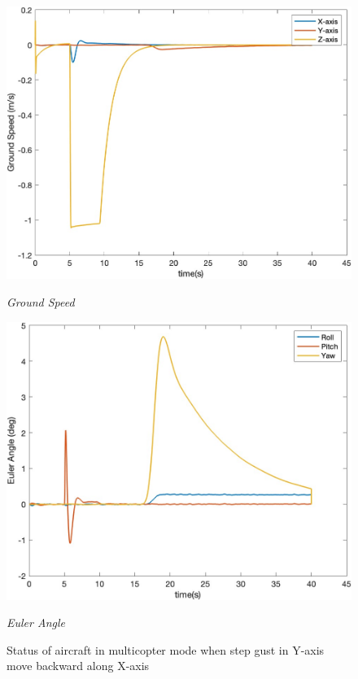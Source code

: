 \begin{figure}[htbp]
\begin{minipage}[b]{0.45\textwidth}
    \centering
    \includegraphics[width=\textwidth]{Images/Gust/VTOL step/3 groundspeed_3.jpg}
    \caption*{\textit{Ground Speed}}
  \end{minipage}
  \hfil
  \begin{minipage}[b]{0.45\textwidth}
    \centering
    \includegraphics[width=\textwidth]{Images/Gust/VTOL step/4 EulerAngle_3.jpg}
    \caption*{\textit{Euler Angle}}
  \end{minipage}
  \caption{Status of aircraft in multicopter mode when step gust in Y-axis move backward along X-axis}
  \label{fig:VTOL step xy}
\end{figure}


